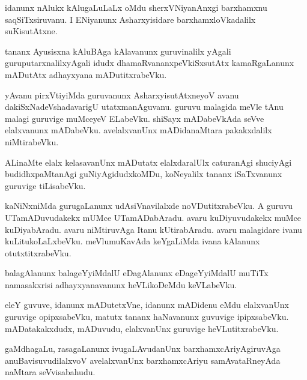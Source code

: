 \documentclass{article}
\begin{document}
\begin{mn}
idanunx nAlukx kAlugaLuLaLx oMdu sherxVNiyanAnxgi barxhamxnu
saqSiTxsiruvanu. I ENiyanunx Asharxyisidare barxhamxloVkadalilx suKisutAtxne.
\end{mn}

\begin{mn}
tananx Ayusisxna kAluBAga kAlavanunx guruvinalilx yAgali
guruputarxnalilxyAgali idudx dhamaRvananxpeVkiSxsutAtx kamaRgaLanunx
mADutAtx adhayxyana mADutitxrabeVku.
\end{mn}

\begin{mn}%
yAvanu pirxVtiyiMda guruvanunx AsharxyisutAtxneyoV avanu
dakiSxNadeVshadavarigU utatxmanAguvanu. guruvu malagida meVle tAnu
malagi guruvige muMceyeV ELabeVku. shiSayx mADabeVkAda seVve
elalxvanunx mADabeVku. avelalxvanUnx mADidanaMtara pakakxdalilx niMtirabeVku.
\end{mn}

\begin{mn}
ALinaMte elalx kelasavanUnx mADutatx elalxdaralUlx caturanAgi
shuciyAgi budidhxpaMtanAgi guNiyAgidudxkoMDu, koNeyalilx tananx
iSaTxvanunx guruvige tiLisabeVku.
\end{mn}

\begin{mn}%
kaNiNxniMda gurugaLanunx udAsiVnavilalxde noVDutitxrabeVku. A guruvu
UTamADuvudakekx mUMce UTamADabAradu. avaru kuDiyuvudakekx muMce
kuDiyabAradu. avaru niMtiruvAga Itanu kUtirabAradu. avaru malagidare
ivanu kuLitukoLaLxbeVku. meVlumuKavAda keYgaLiMda ivana kAlanunx otutxtitxrabeVku.
\end{mn}

\begin{mn}%
balagAlanunx balageYyiMdalU eDagAlanunx eDageYyiMdalU muTiTx
namasakxrisi adhayxyanavanunx heVLikoDeMdu keVLabeVku.
\end{mn}

\begin{mn}
eleY guvuve, idanunx mADutetxVne, idanunx mADidenu eMdu elalxvanUnx
guruvige opipxsabeVku, matutx tananx haNavanunx guvuvige
ipipxsabeVku. mADatakakxdudx, mADuvudu, elalxvanUnx guruvige heVLutitxrabeVku.
\end{mn}

\begin{mn}
gaMdhagaLu, rasagaLanunx ivugaLAvudanUnx barxhamxcAriyAgiruvAga
anuBavisuvudilalxvoV avelalxvanUnx barxhamxcAriyu samAvataRneyAda
naMtara seVvisabahudu.
\end{mn}
\end{document}
